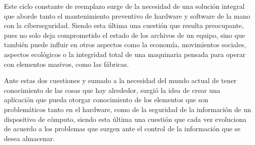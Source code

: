 Este ciclo constante de reemplazo surge de la necesidad de una solución integral
que aborde tanto el mantenimiento preventivo de hardware y software de la mano
con la ciberseguridad. Siendo esta última una cuestión que resulta preocupante,
pues no solo deja comprometido el estado de los archivos de un equipo, sino que
también puede influir en otros aspectos como la economía, movimientos sociales,
aspectos ecológicos o la integridad total de una maquinaria pensada para operar
con elementos masivos, como las fábricas.

Ante estas dos cuestiones y sumado a la necesidad del mundo actual de tener
conocimiento de las cosas que hay alrededor, surgió la idea de crear una
aplicación que pueda otorgar conocimiento de los elementos que son problemáticos
tanto en el hardware, como de la seguridad de la información de un dispositivo
de cómputo, siendo esta última una cuestión que cada vez evoluciona de acuerdo a
los problemas que surgen ante el control de la información que se desea
almacenar.

